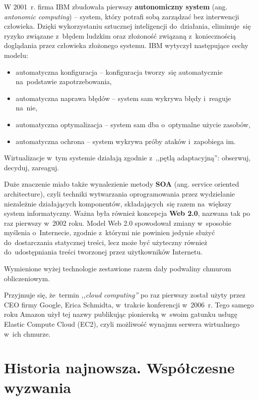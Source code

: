 \documentclass[12pt,a4paper,twoside,titlepage,openright]{book}
\begin{document}
W 2001~r. firma IBM zbudowała pierwszy \textbf{autonomiczny system} (ang. \textit{antonomic computing}) -- system, który potrafi sobą zarządzać bez interwencji człowieka. Dzięki wykorzystaniu sztucznej inteligencji do~działania, eliminuje~się ryzyko związane z~błędem ludzkim oraz złożoność związaną z~koniecznością doglądania przez człowieka złożonego systemu. IBM wytyczył następujące cechy modelu:
\begin{itemize}
\item automatyczna konfiguracja -- konfiguracja tworzy~się automatycznie na~podstawie zapotrzebowania,
\item automatyczna naprawa błędów -- system sam wykrywa błędy i~reaguje na~nie,
\item automatyczna optymalizacja -- system sam dba o~optymalne użycie zasobów,
\item automatyczna ochrona -- system wykrywa próby ataków i~zapobiega im.
\end{itemize}
Wirtualizacje w~tym systemie działają zgodnie z~,,pętlą adaptacyjną'': obserwuj, decyduj, zareaguj.\cite{ccSpringer}


Duże znaczenie miało także wynalezienie metody \textbf{SOA} (ang. service oriented architecture), czyli techniki wytwarzania oprogramowania przez wydzielanie niezależnie działających komponentów, składających~się razem na~większy system informatyczny. Ważna była również koncepcja \textbf{Web 2.0}, nazwana tak po raz pierwszy w~2002 roku. Model Web 2.0 spowodował zmiany w~sposobie myślenia o~Internecie, zgodnie z~którymi nie powinien jedynie służyć do~dostarczania statycznej treści, lecz może być użyteczny również do~udostępniania treści tworzonej przez użytkowników Internetu.

Wymienione wyżej technologie zestawione razem dały podwaliny chmurom obliczeniowym.

Przyjmuje się, że~termin \textit{,,cloud computing''} po raz pierwszy został użyty przez CEO firmy Google, Erica Schmidta, w~trakcie konferencji w~2006~r. Tego samego roku Amazon użył tej nazwy publikując pionierską w~swoim gatunku usługę Elastic Compute Cloud (EC2), czyli możliwość wynajmu serwera wirtualnego w~ich chmurze.

\section{Historia najnowsza. Współczesne wyzwania}
\end{document}
